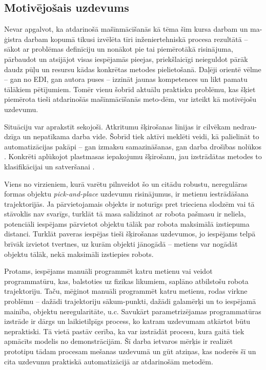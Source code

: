 \documentclass[12pt, a4paper]{article}
\numberwithin{equation}{section} %
\begin{document}
\subsection*{Motivējošais uzdevums} %

Nevar apgalvot, ka atdarinošā mašīnmācīšanās kā tēma šim kursa darbam un ma-ģistra darbam kopumā tikusi izvēlēta tīri inženiertehniskā procesa rezultātā -- sākot ar problēmas definīciju un nonākot pie tai piemērotākā risinājuma, pārbaudot un atsijājot visas iespējamās pieejas, priekšlaicīgi neieguldot pārāk daudz pūļu un resursu kādas konkrētas metodes pielietošanā. Daļēji orientē vēlme -- gan no EDI, gan autora puses -- izzināt jaunas kompetences un likt pamatu tālākiem pētījumiem. Tomēr vienu šobrīd aktuālu praktisku problēmu, kas šķiet piemērota tieši atdarinošās mašīnmācīšanās meto-dēm, var izteikt kā motivējošu uzdevumu. 

Situāciju var aprakstīt sekojoši. Atkritumu šķirošanas līnijas ir cilvēkam nedrau-dzīga un nepatīkama darba vide. Šobrīd tiek aktīvi meklēti veidi, kā palielināt to automatizācijas pakāpi -- gan izmaksu samazināšanas, gan darba drošības nolūkos \cite{trashbot}. Konkrēti aplūkojot plastmasas iepakojumu šķirošanu, jau izstrādātas metodes to klasifikācijai un satveršanai \cite{trashbot}. 

Viens no virzieniem, kurā varētu pilnveidot šo un citādu robustu, neregulāras formas objektu \textit{pick-and-place} uzdevumu risinājumus, ir metienu iestrādāšana trajektorijās. Ja pārvietojamais objekts ir noturīgs pret trieciena slodzēm vai tā stāvoklis nav svarīgs, turklāt tā masa salīdzinot ar robota pašmasu ir neliela, potenciāli iespējams pārvietot objektu tālāk par robota maksimālā izstiepuma distanci. Turklāt paveras iespējas tieši šķirošanas uzdevumos, jo iespējams telpā brīvāk izvietot tvertnes, uz kurām objekti jānogādā -- metiens var nogādāt objektu tālāk, nekā maksimāli izstiepies robots. 

Protams, iespējams manuāli programmēt katru metienu vai veidot programmatūru, kas, balstoties uz fizikas likumiem, saplāno atbilstošu robota trajektoriju. Taču, mēģinot manuāli programmēt katru metienu, rodas virkne problēmu -- dažādi trajektoriju sākum-punkti, dažādi galamērķi un to iespējamā mainība, objektu neregularitāte, u.c. Savukārt parametrizējamas programmatūras izstrāde ir dārgs un laikietilpīgs process, ko katram uzdevumam atkārtot būtu nepraktiski. Tā vietā pastāv cerība, ka var izstrādāt procesu, kura gaitā tiek apmācīts modelis no demonstrācijām. Šī darba ietvaros mērķis ir realizēt prototipu tādam procesam mešanas uzdevumā un gūt atziņas, kas noderēs šī un cita uzdevumu praktiskā automatizācijā ar atdarinošām metodēm.
\end{document}
